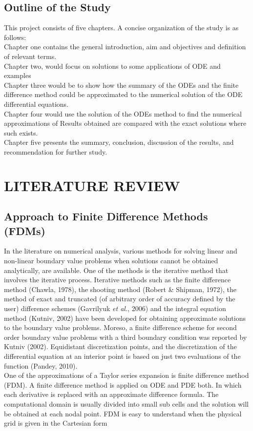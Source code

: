 \documentclass[12pt]{report}
\newcommand{\sps}{\\[0.2cm]}
\newcommand{\NI}{\noindent}
\begin{document}
	
	\section{Outline of the Study}
	This project consists of five chapters. A concise organization of the study is as follows:\sps
	Chapter one contains the general introduction, aim and objectives and definition of relevant terms.\sps
	Chapter two, would focus on solutions to some applications of ODE and examples\sps
	Chapter three would be to show how the summary of the ODEs and the finite difference method could be approximated to the numerical solution of the ODE differential equations.\sps
	Chapter four would use the solution of the ODEs method to find the numerical approximations of Results obtained are compared with the exact solutions where such exists.\sps
	Chapter five presents the summary, conclusion, discussion of the results, and recommendation for further study.
	

	\chapter{LITERATURE REVIEW}
	\section{Approach to Finite Difference Methods (FDMs)}
	In the literature on numerical analysis, various methods for solving linear and non-linear boundary value problems when solutions cannot be obtained analytically, are available. One of the methods is the iterative method that involves the iterative process. Iterative methods such as the finite difference method (Chawla, 1978), the shooting method (Robert \& Shipman, 1972), the method of exact and truncated (of arbitrary order of accuracy defined by the user) difference schemes (Gavrilyuk \textit{et al.}, 2006) and the integral equation method (Kutniv, 2002) have been developed for obtaining approximate solutions to the boundary value problems. Moreso, a finite difference scheme for second order boundary value problems with a third boundary condition was reported by Kutniv (2002). Equidistant discretization points, and the discretization of the differential equation at an interior point is based on just two evaluations of the function (Pandey, 2010).\sps
	
	\NI One of the approximations of a Taylor series expansion is finite difference method (FDM). A finite difference method is applied on ODE and PDE both. In which each derivative is replaced with an approximate difference formula. The computational domain is usually divided into small sub cells
	and the solution will be obtained at each nodal point. FDM is easy to understand when the physical grid is given in the Cartesian form
	
\end{document}
